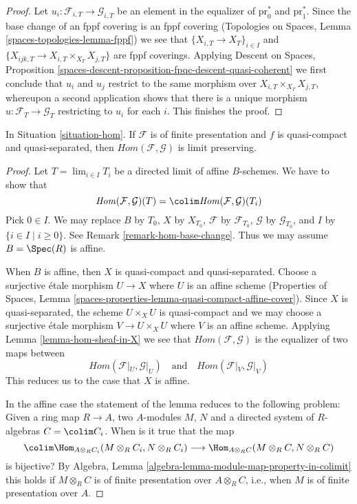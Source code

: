 \begin{proof}
Let $u_i : \mathcal{F}_{i, T} \to \mathcal{G}_{i, T}$ be an element in the
equalizer of $\text{pr}_0^*$ and $\text{pr}_1^*$. Since the base change
of an fppf covering is an fppf covering
(Topologies on Spaces, Lemma \ref{spaces-topologies-lemma-fppf})
we see that $\{X_{i, T} \to X_T\}_{i \in I}$ and
$\{X_{ijk, T} \to X_{i, T} \times_{X_T} X_{j, T}\}$ are fppf coverings.
Applying Descent on Spaces, Proposition
\ref{spaces-descent-proposition-fpqc-descent-quasi-coherent}
we first conclude that $u_i$ and $u_j$ restrict to the same morphism
over $X_{i, T} \times_{X_T} X_{j, T}$, whereupon a second application
shows that there is a unique morphism $u : \mathcal{F}_T \to \mathcal{G}_T$
restricting to $u_i$ for each $i$. This finishes the proof.
\end{proof}

\begin{lemma}
\label{lemma-hom-limits}
In Situation \ref{situation-hom}. If $\mathcal{F}$ is of finite presentation
and $f$ is quasi-compact and quasi-separated, then
$\mathit{Hom}(\mathcal{F}, \mathcal{G})$ is limit preserving.
\end{lemma}

\begin{proof}
Let $T = \lim_{i \in I} T_i$ be a directed limit of affine $B$-schemes.
We have to show that
$$
\mathit{Hom}(\mathcal{F}, \mathcal{G})(T) =
\colim \mathit{Hom}(\mathcal{F}, \mathcal{G})(T_i)
$$
Pick $0 \in I$. We may replace $B$ by $T_0$, $X$ by $X_{T_0}$,
$\mathcal{F}$ by $\mathcal{F}_{T_0}$, $\mathcal{G}$ by
$\mathcal{G}_{T_0}$, and $I$ by $\{i \in I \mid i \geq 0\}$.
See Remark \ref{remark-hom-base-change}.
Thus we may assume $B = \Spec(R)$ is affine.

\medskip\noindent
When $B$ is affine, then $X$ is quasi-compact and quasi-separated.
Choose a surjective \'etale morphism $U \to X$ where $U$ is an
affine scheme (Properties of Spaces, Lemma
\ref{spaces-properties-lemma-quasi-compact-affine-cover}).
Since $X$ is quasi-separated, the scheme $U \times_X U$ is quasi-compact
and we may choose a surjective \'etale morphism $V \to U \times_X U$
where $V$ is an affine scheme. Applying Lemma \ref{lemma-hom-sheaf-in-X}
we see that $\mathit{Hom}(\mathcal{F}, \mathcal{G})$ is the
equalizer of two maps between
$$
\mathit{Hom}(\mathcal{F}|_U, \mathcal{G}|_U)
\quad\text{and}\quad
\mathit{Hom}(\mathcal{F}|_V, \mathcal{G}|_V)
$$
This reduces us to the case that $X$ is affine.

\medskip\noindent
In the affine case the statement of the lemma reduces to
the following problem: Given a ring map $R \to A$, two $A$-modules
$M$, $N$ and a directed system of $R$-algebras $C = \colim C_i$.
When is it true that the map
$$
\colim \Hom_{A \otimes_R C_i}(M \otimes_R C_i, N \otimes_R C_i)
\longrightarrow
\Hom_{A \otimes_R C}(M \otimes_R C, N \otimes_R C)
$$
is bijective? By
Algebra, Lemma \ref{algebra-lemma-module-map-property-in-colimit}
this holds if $M \otimes_R C$ is of finite presentation over
$A \otimes_R C$, i.e., when $M$ is of finite presentation over $A$.
\end{proof}

